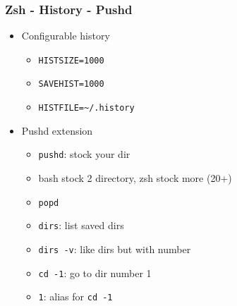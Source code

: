 \subsubsection{Zsh - History - Pushd}
\begin{frame}[fragile]{\subsubsecname}
  \begin{itemize}
    \item Configurable history
    \begin{itemize}
      \item \texttt{HISTSIZE=1000}
      \item \texttt{SAVEHIST=1000}
      \item \texttt{HISTFILE=\textasciitilde{}/.history}
    \end{itemize}
    \item Pushd extension
    \begin{itemize}
      \item \texttt{pushd}: stock your dir
      \item bash stock 2 directory, zsh stock more (20+)
      \item \texttt{popd}
      \item \texttt{dirs}: list saved dirs
      \item \texttt{dirs -v}: like dirs but with number
      \item \texttt{cd -1}: go to dir number 1
      \item \texttt{1}: alias for \texttt{cd -1}
    \end{itemize}
  \end{itemize}
\end{frame}
